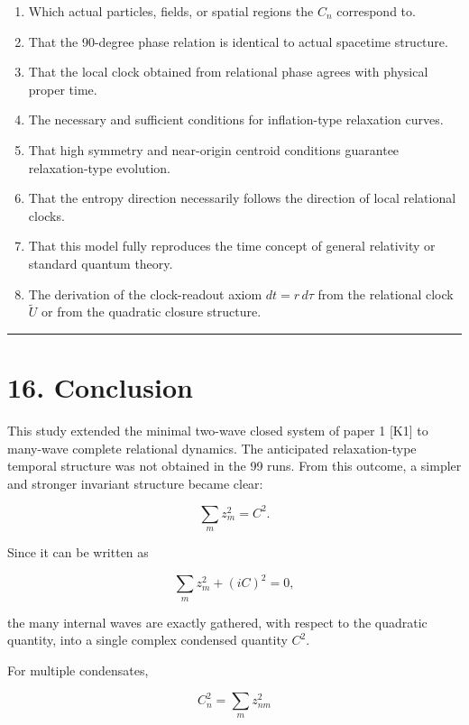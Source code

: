 \documentclass[
  a4paper,
]{article}
\providecommand{\tightlist}{%
  \setlength{\itemsep}{0pt}\setlength{\parskip}{0pt}}
\begin{document}
\begin{enumerate}
\def\labelenumi{\arabic{enumi}.}
\tightlist
\item
  Which actual particles, fields, or spatial regions the \(C_n\)
  correspond to.
\item
  That the 90-degree phase relation is identical to actual spacetime
  structure.
\item
  That the local clock obtained from relational phase agrees with
  physical proper time.
\item
  The necessary and sufficient conditions for inflation-type relaxation
  curves.
\item
  That high symmetry and near-origin centroid conditions guarantee
  relaxation-type evolution.
\item
  That the entropy direction necessarily follows the direction of local
  relational clocks.
\item
  That this model fully reproduces the time concept of general
  relativity or standard quantum theory.
\item
  The derivation of the clock-readout axiom \(dt=r\,d\tau\) from the
  relational clock \(\tilde U\) or from the quadratic closure structure.
\end{enumerate}

\begin{center}\rule{0.5\linewidth}{0.5pt}\end{center}

\section{16. Conclusion}\label{conclusion}

This study extended the minimal two-wave closed system of paper 1
{[}K1{]} to many-wave complete relational dynamics. The anticipated
relaxation-type temporal structure was not obtained in the 99 runs. From
this outcome, a simpler and stronger invariant structure became clear:

\[
\boxed{
\sum_m z_m^2=C^2
}.
\]

Since it can be written as

\[
\sum_mz_m^2+(iC)^2=0,
\]

the many internal waves are exactly gathered, with respect to the
quadratic quantity, into a single complex condensed quantity \(C^2\).

For multiple condensates,

\[
C_n^2=\sum_mz_{nm}^2
\]
\end{document}
